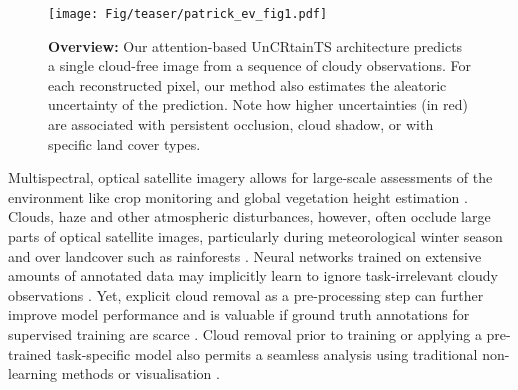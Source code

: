 \documentclass[10pt,twocolumn,letterpaper]{article}
\let\oldtextbf\textbf
\renewcommand{\textbf}[1]{\oldtextbf{\boldmath #1}}
\begin{document}
\begin{figure}[ht!]
    \centering
    \texttt{[image: Fig/teaser/patrick\_ev\_fig1.pdf]}
    \caption{\textbf{Overview:} Our attention-based UnCRtainTS architecture predicts a single cloud-free image from a sequence of cloudy observations. For each reconstructed pixel, our method also estimates the aleatoric uncertainty of the prediction. Note how higher uncertainties (in red) are associated with persistent occlusion, cloud shadow, or with specific land cover types. 
    }
    \label{fig:teaser}
\end{figure}

Multispectral, optical satellite imagery allows for large-scale assessments of the environment like crop monitoring \cite{russwurm2017temporal,TURKOGLU2021112603} and global vegetation height estimation \cite{lang2022high,lang2022global}. Clouds, haze and other atmospheric disturbances, however, often occlude large parts of optical satellite images, 
particularly during meteorological winter season \cite{King_Platnick_Menzel_Ackerman_Hubanks_2013} and over landcover such as rainforests \cite{Bermudez_Happ_Oliveira_Feitosa_2018}. Neural networks trained on extensive amounts of annotated data may implicitly learn to ignore task-irrelevant cloudy observations \cite{russwurm2020self, russwurm2017temporal,metzger2021}. Yet, explicit cloud removal as a pre-processing step can further improve model performance and is valuable if ground truth annotations for supervised training are scarce \cite{explicitCR}. Cloud removal prior to training or applying a pre-trained task-specific model also permits a seamless analysis using traditional non-learning methods or visualisation \cite{LIU2021112364}.


\noindent
\end{document}
